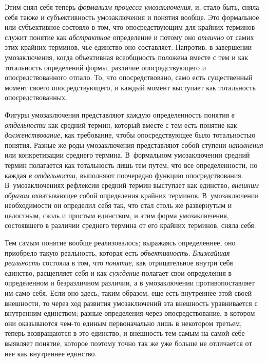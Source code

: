 Этим снял себя теперь {\em формализм процесса умозаключения},
и, стало быть, сняла себя также и субъективность
умозаключения и понятия вообще. Это формальное или субъективное состояло в
том, что опосредствующим для крайних терминов служит понятие как
{\em абстрактное} определение и потому оно {\em отлично} от самих
этих крайних терминов, чье единство оно составляет. Напротив, в завершении
умозаключения, когда объективная всеобщность положена вместе с тем и как
тотальность определений формы, различие опосредствующего и
опосредствованного отпало. То, что опосредствовано, само есть существенный
момент своего опосредствующего, и каждый момент выступает как тотальность
опосредствованных.

Фигуры умозаключения представляют каждую определенность
понятия {\em в отдельности}
как средний термин, который вместе с тем есть понятие как
{\em долженствование},
как требование, чтобы опосредствующее было тотальностью
понятия. Разные же роды умозаключения представляют собой ступени
{\em наполнения} или
конкретизации среднего термина. В~формальном умозаключении средний термин
полагается как тотальность лишь тем путем, что все определенности, но
каждая {\em в отдельности},
выполняют поочередно функцию опосредствования.
В~умозаключениях рефлексии средний термин выступает как единство,
{\em внешним образом} охватывающее собой определения крайних терминов.
В~умозаключении необходимости он определил себя так, что стал столь же
развернутым и целостным, сколь и простым единством, и этим форма
умозаключения, состоявшего в различии среднего термина от его крайних
терминов, сняла себя.

Тем самым понятие вообще реализовалось; выражаясь
определеннее, оно приобрело такую реальность, которая есть
{\em объективность}. {\em Ближайшая реальность} состояла в том, что
{\em понятие}, как отрицательное внутри себя единство, расщепляет себя и как
{\em суждение} полагает
свои определения в определенном и безразличном различии, а в умозаключении
противопоставляет им само себя. Если оно здесь, таким образом, еще есть
внутреннее этой своей внешности, то через ход развития умозаключений эта
внешность уравнивается с внутренним единством; разные определения через
опосредствование, в котором они оказываются чем-то единым первоначально
лишь в некотором третьем, теперь возвращаются в это единство, и внешность
тем самым на самой себе выявляет понятие, которое поэтому точно так же уже
больше не отличается от нее как внутреннее единство.

